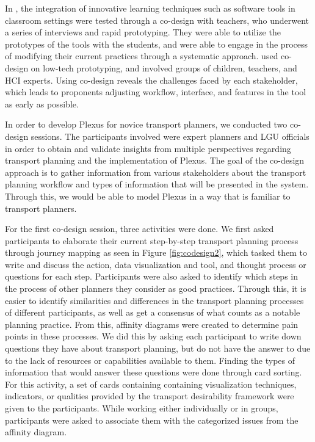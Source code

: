 \documentclass{sigchi}
\begin{document}
In \cite{roschelle:2006}, the integration of innovative learning techniques such as software tools in classroom settings were tested through a co-design with teachers, who underwent a series of interviews and rapid prototyping. They were able to utilize the prototypes of the tools with the students, and were able to engage in the process of modifying their current practices through a systematic approach. \cite{Alhumaidan2015} used co-design on low-tech prototyping, and involved groups of children, teachers, and HCI experts. Using co-design reveals the challenges faced by each stakeholder, which leads to proponents adjusting workflow, interface, and features in the tool as early as possible. 

In order to develop Plexus for novice transport planners, we conducted two co-design sessions. The participants involved were expert planners and LGU officials in order to obtain and validate insights from multiple perspectives regarding transport planning and the implementation of Plexus. The goal of the co-design approach is to gather information from various stakeholders about the transport planning workflow and types of information that will be presented in the system. Through this, we would be able to model Plexus in a way that is familiar to transport planners.

For the first co-design session, three activities were done. We first asked participants to elaborate their current step-by-step transport planning process through journey mapping as seen in Figure \ref{fig:codesign2}, which tasked them to write and discuss the action, data visualization and tool, and thought process or questions for each step. Participants were also asked to identify which steps in the process of other planners they consider as good practices. Through this, it is easier to identify similarities and differences in the transport planning processes of different participants, as well as get a consensus of what counts as a notable planning practice. From this, affinity diagrams were created to determine pain points in these processes. We did this by asking each participant to write down questions they have about transport planning, but do not have the answer to due to the lack of resources or capabilities available to them. Finding the types of information that would answer these questions were done through card sorting. For this activity, a set of cards containing containing visualization techniques, indicators, or qualities provided by the transport desirability framework were given to the participants. While working either individually or in groups, participants were asked to associate them with the categorized issues from the affinity diagram.
\end{document}
